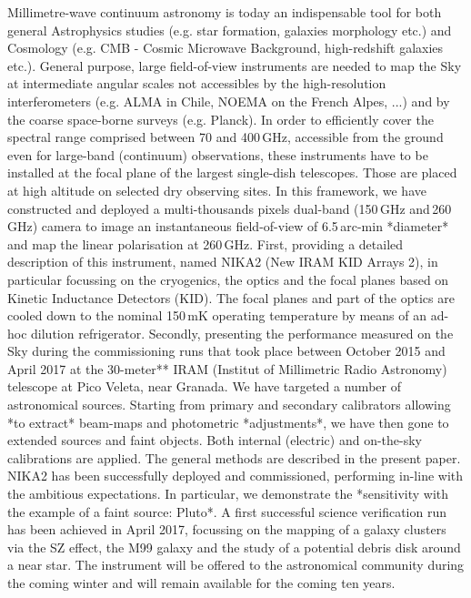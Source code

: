 \documentclass[]{aa} %
\begin{document}
  \abstract
   {Millimetre-wave continuum astronomy is today an indispensable tool for both
     general Astrophysics studies (e.g. star formation, galaxies morphology
     etc.) and Cosmology (e.g. CMB - Cosmic Microwave Background, high-redshift
     galaxies etc.). General purpose, large field-of-view instruments are needed
     to map the Sky at intermediate angular scales not accessibles by the
     high-resolution interferometers (e.g. ALMA in Chile, NOEMA on the French
     Alpes, ...) and by the coarse space-borne surveys (e.g. Planck). In order
     to efficiently cover the spectral range comprised between 70 and 400\,GHz,
     accessible from the ground even for large-band (continuum) observations,
     these instruments have to be installed at the focal plane of the largest
     single-dish telescopes. Those are placed at high altitude on selected dry
     observing sites. In this framework, we have constructed and deployed a
     multi-thousands pixels dual-band (150\,GHz and\,260 GHz) camera to image an
     instantaneous field-of-view of 6.5\,arc-min *diameter* and map the linear polarisation at 260\,GHz.}
   {First, providing a detailed description of this instrument, named NIKA2 (New IRAM KID Arrays 2), in particular focussing on the cryogenics, the optics  and the focal planes based on Kinetic Inductance Detectors (KID). The focal planes and part of the optics are cooled down to the nominal 150\,mK operating temperature by means of an ad-hoc dilution refrigerator. 
Secondly, presenting the performance measured on the Sky during the commissioning runs that took place between October 2015 and April 2017 at the 30-meter** IRAM (Institut of Millimetric Radio Astronomy) telescope at Pico Veleta, near Granada.}
{We have targeted a number of astronomical
   sources. Starting from primary and secondary calibrators allowing *to extract*
   beam-maps and photometric *adjustments*, we have then gone to extended sources
   and faint objects. Both internal (electric) and on-the-sky calibrations are
   applied. The general methods are described in the present paper.}
{NIKA2 has been successfully deployed and
     commissioned, performing in-line with the ambitious expectations. In
     particular, we demonstrate the *sensitivity with the example of a faint
     source: Pluto*. A first successful science verification
     run has been achieved in April 2017, focussing on the mapping of a galaxy
     clusters via the SZ effect, the M99 galaxy and the study of a potential
     debris disk around a near star. The instrument will be offered to the
     astronomical community during the coming winter and will remain available
     for the coming ten years.}
 
\end{document}
